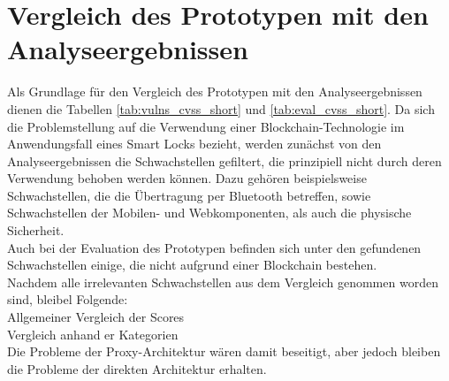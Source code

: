 \section{Vergleich des Prototypen mit den Analyseergebnissen}
\label{sec:comparison}
    Als Grundlage für den Vergleich des Prototypen mit den Analyseergebnissen dienen die Tabellen \ref{tab:vulns_cvss_short} und \ref{tab:eval_cvss_short}.
    Da sich die Problemstellung auf die Verwendung einer Blockchain-Technologie im Anwendungsfall eines Smart Locks bezieht, werden zunächst von den Analyseergebnissen die Schwachstellen gefiltert, die prinzipiell nicht durch deren Verwendung behoben werden können. 
    Dazu gehören beispielsweise Schwachstellen, die die Übertragung per Bluetooth betreffen, sowie Schwachstellen der Mobilen- und Webkomponenten, als auch die physische Sicherheit. 
    \medskip\\
    Auch bei der Evaluation des Prototypen befinden sich unter den gefundenen Schwachstellen einige, die nicht aufgrund einer Blockchain bestehen. 
    \medskip\\
    Nachdem alle irrelevanten Schwachstellen aus dem Vergleich genommen worden sind, bleibel Folgende:
    \bigskip\\
    Allgemeiner Vergleich der Scores
    \medskip\\
    Vergleich anhand er Kategorien
    \bigskip\\
    Die Probleme der Proxy-Architektur wären damit beseitigt, aber jedoch bleiben die Probleme der direkten Architektur erhalten.
    